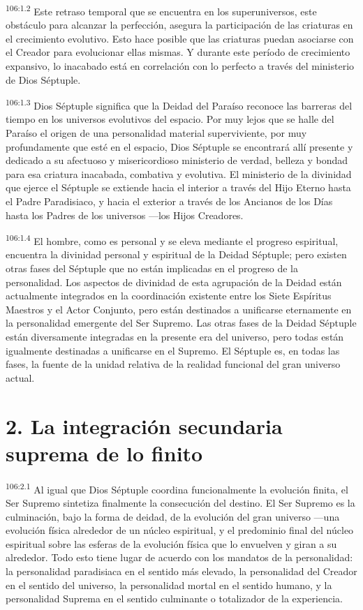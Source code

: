 \documentclass[twoside, 11pt]{book}
\begin{document}
\par
\textsuperscript{106:1.2} Este retraso temporal que se encuentra en los superuniversos, este obstáculo para alcanzar la perfección, asegura la participación de las criaturas en el crecimiento evolutivo. Esto hace posible que las criaturas puedan asociarse con el Creador para evolucionar ellas mismas. Y durante este período de crecimiento expansivo, lo inacabado está en correlación con lo perfecto a través del ministerio de Dios Séptuple.

\par
\textsuperscript{106:1.3} Dios Séptuple significa que la Deidad del Paraíso reconoce las barreras del tiempo en los universos evolutivos del espacio. Por muy lejos que se halle del Paraíso el origen de una personalidad material superviviente, por muy profundamente que esté en el espacio, Dios Séptuple se encontrará allí presente y dedicado a su afectuoso y misericordioso ministerio de verdad, belleza y bondad para esa criatura inacabada, combativa y evolutiva. El ministerio de la divinidad que ejerce el Séptuple se extiende hacia el interior a través del Hijo Eterno hasta el Padre Paradisiaco, y hacia el exterior a través de los Ancianos de los Días hasta los Padres de los universos ---los Hijos Creadores.

\par
\textsuperscript{106:1.4} El hombre, como es personal y se eleva mediante el progreso espiritual, encuentra la divinidad personal y espiritual de la Deidad Séptuple; pero existen otras fases del Séptuple que no están implicadas en el progreso de la personalidad. Los aspectos de divinidad de esta agrupación de la Deidad están actualmente integrados en la coordinación existente entre los Siete Espíritus Maestros y el Actor Conjunto, pero están destinados a unificarse eternamente en la personalidad emergente del Ser Supremo. Las otras fases de la Deidad Séptuple están diversamente integradas en la presente era del universo, pero todas están igualmente destinadas a unificarse en el Supremo. El Séptuple es, en todas las fases, la fuente de la unidad relativa de la realidad funcional del gran universo actual.

\section*{2. La integración secundaria suprema de lo finito}
\par
\textsuperscript{106:2.1} Al igual que Dios Séptuple coordina funcionalmente la evolución finita, el Ser Supremo sintetiza finalmente la consecución del destino. El Ser Supremo es la culminación, bajo la forma de deidad, de la evolución del gran universo ---una evolución física alrededor de un núcleo espiritual, y el predominio final del núcleo espiritual sobre las esferas de la evolución física que lo envuelven y giran a su alrededor. Todo esto tiene lugar de acuerdo con los mandatos de la personalidad: la personalidad paradisiaca en el sentido más elevado, la personalidad del Creador en el sentido del universo, la personalidad mortal en el sentido humano, y la personalidad Suprema en el sentido culminante o totalizador de la experiencia.
\end{document}
